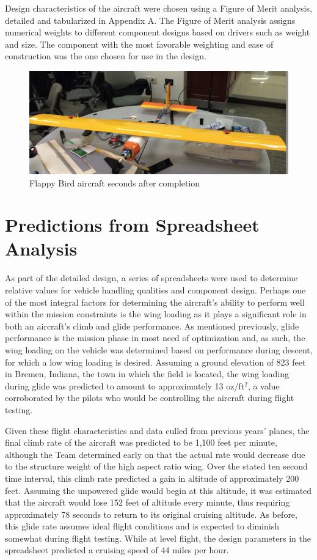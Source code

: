 \documentclass[titlepage]{article}
\begin{document}
Design characteristics of the aircraft were chosen using a Figure of Merit analysis, detailed and tabularized in Appendix A. The Figure of Merit analysis assigns numerical weights to different component designs based on drivers such as weight and size. The component with the most favorable weighting and ease of construction was the one chosen for use in the design.
\begin{figure}[h]
 \includegraphics[width=1\columnwidth]{Real_Wing.jpg}
 \caption{Flappy Bird aircraft seconds after completion}
\label{real}
\end{figure}

\section{Predictions from Spreadsheet Analysis}
As part of the detailed design, a series of spreadsheets were used to determine relative values for vehicle handling qualities and component design. Perhaps one of the most integral factors for determining the aircraft's ability to perform well within the mission constraints is the wing loading as it plays a significant role in both an aircraft's climb and glide performance. As mentioned previously, glide performance is the mission phase in most need of optimization and, as such, the wing loading on the vehicle was determined based on performance during descent, for which a low wing loading is desired. Assuming a ground elevation of 823 feet in Bremen, Indiana, the town in which the field is located, the wing loading during glide was predicted to amount to approximately 13 oz/ft$^2$, a value corroborated by the pilots who would be controlling the aircraft during flight testing.

Given these flight characteristics and data culled from previous years' planes, the final climb rate of the aircraft was predicted to be 1,100 feet per minute, although the Team determined early on that the actual rate would decrease due to the structure weight of the high aspect ratio wing. Over the stated ten second time interval, this climb rate predicted a gain in altitude of approximately 200 feet. Assuming the unpowered glide would begin at this altitude, it was estimated that the aircraft would lose 152 feet of altitude every minute, thus requiring approximately 78 seconds to return to its original cruising altitude. As before, this glide rate assumes ideal flight conditions and is expected to diminish somewhat during flight testing. While at level flight, the design parameters in the spreadsheet predicted a cruising speed of 44 miles per hour.
\end{document}
